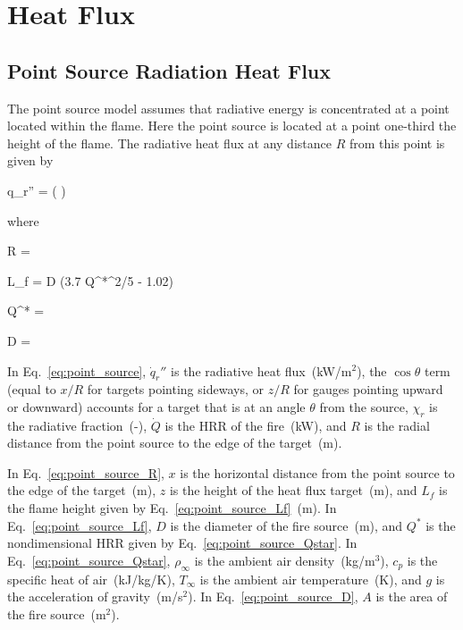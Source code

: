 
\chapter{Heat Flux}
\label{Heat_Flux_Chapter}

\section{Point Source Radiation Heat Flux}

The point source model assumes that radiative energy is concentrated at a point located within the flame. Here the point source is located at a point one-third the height of the flame. The radiative heat flux at any distance $R$ from this point is given by

\be
\dot q_r'' = \cos\theta \left(  \right)
\label{eq:point_source}
\ee

\noindent where

\be
R = 
\label{eq:point_source_R}
\ee

\be
L_f = D (3.7 Q^{*^{2/5}} - 1.02)
\label{eq:point_source_Lf}
\ee

\be
Q^* = 
\label{eq:point_source_Qstar}
\ee

\be
D = 
\label{eq:point_source_D}
\ee

In Eq.~\ref{eq:point_source}, $\dot q_r''$ is the radiative heat flux~(kW/m$^2$), the $\cos\theta$ term (equal to $x/R$ for targets pointing sideways, or $z/R$ for gauges pointing upward or downward) accounts for a target that is at an angle $\theta$ from the source, $\chi_r$ is the radiative fraction~(-), $\dot Q$ is the HRR of the fire~(kW), and $R$ is the radial distance from the point source to the edge of the target~(m).

In Eq.~\ref{eq:point_source_R}, $x$ is the horizontal distance from the point source to the edge of the target~(m), $z$ is the height of the heat flux target~(m), and $L_f$ is the flame height given by Eq.~\ref{eq:point_source_Lf}~(m).
In Eq.~\ref{eq:point_source_Lf}, $D$ is the diameter of the fire source~(m), and $Q^*$ is the nondimensional HRR given by Eq.~\ref{eq:point_source_Qstar}. In Eq.~\ref{eq:point_source_Qstar}, $\rho_\infty$ is the ambient air density~(kg/m$^3$), $c_p$ is the specific heat of air~(kJ/kg/K), $T_\infty$ is the ambient air temperature~(K), and $g$ is the acceleration of gravity~(m/s$^2$). In Eq.~\ref{eq:point_source_D}, $A$ is the area of the fire source~(m$^2$).


